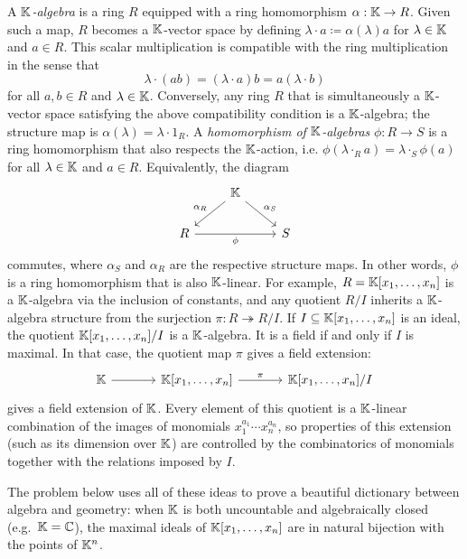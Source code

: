 \documentclass[12pt,reqno]{amsart}
\begin{document}
A \emph{$\mathbb{K}$-algebra} is a ring $R$ equipped with a ring homomorphism $\alpha: \mathbb{K} \to R$. Given such a map, $R$ becomes a
$\mathbb{K}$-vector space by defining $\lambda\cdot a \coloneqq \alpha(\lambda)a$ for $\lambda\in\mathbb{K}$ and $a\in R$. This scalar multiplication is compatible with the ring multiplication in the sense that
\[
\lambda\cdot(ab) = (\lambda\cdot a)b = a(\lambda\cdot b)
\]
for all $a,b\in R$ and $\lambda \in \mathbb{K}$. Conversely, any ring $R$ that is simultaneously a $\mathbb{K}$-vector space satisfying the above compatibility condition is a $\mathbb{K}$-algebra; the structure map is $\alpha(\lambda)=\lambda\cdot 1_R$. A \emph{homomorphism of $\mathbb{K}$-algebras} $\phi: R\to S$ is a
ring homomorphism that also respects the $\mathbb{K}$-action, i.e. $\phi(\lambda \cdot_{R} a) = \lambda \cdot_{S} \phi(a)$ for all $\lambda \in \mathbb{K}$ and $a\in R$. Equivalently, the diagram
\[
\begin{tikzcd}
& \KK \arrow[dl,"\alpha_R"'] \arrow[dr,"\alpha_S"] & \\
R \arrow[rr,"\phi"'] & & S
\end{tikzcd}
\]
commutes, where $\alpha_S$ and $\alpha_R$ are the respective structure maps. In other words, $\phi$ is a ring homomorphism that is also $\mathbb{K}$-linear.  For example, $R=\mathbb{K}[x_1,\ldots,x_n]$ is a $\mathbb{K}$-algebra via the inclusion of constants, and any quotient $R/I$ inherits a $\mathbb{K}$-algebra structure from the surjection $\pi:R\twoheadrightarrow R/I$. If $I\subseteq \mathbb{K}[x_1,\ldots,x_n]$ is an ideal, the quotient $\mathbb{K}[x_1,\ldots,x_n]/I$ is a $\mathbb{K}$-algebra. It is a field if and only if $I$ is maximal. In that case, the quotient map $\pi$ gives a field extension:
\[
\begin{tikzcd}[row sep = .5em, column sep = 3.5em]
\KK \arrow[r] & \KK[x_1,\ldots,x_n] \arrow[r,"\pi"]  & \KK[x_1,\ldots,x_n]/I
\end{tikzcd}
\]
 gives a field extension of $\mathbb{K}$. Every element of this quotient is a $\mathbb{K}$-linear combination of the images of monomials $x_1^{a_1}\cdots x_n^{a_n}$, so properties of this extension (such as its dimension over $\mathbb{K}$) are controlled by the combinatorics of monomials together with the relations imposed by $I$.

The problem below uses all of these ideas to prove a beautiful dictionary between algebra and geometry: when $\mathbb{K}$ is both uncountable and algebraically closed (e.g.\ $\mathbb{K}=\mathbb{C}$), the maximal ideals of $\mathbb{K}[x_1,\ldots,x_n]$ are in natural bijection with the points of $\mathbb{K}^n$.

\hrulefill
\end{document}
